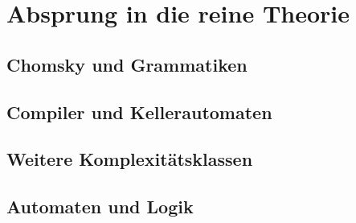 \chapter{Absprung in die reine Theorie}
\section{Chomsky und Grammatiken}
\section{Compiler und Kellerautomaten}
\section{Weitere Komplexitätsklassen}
\section{Automaten und Logik}

